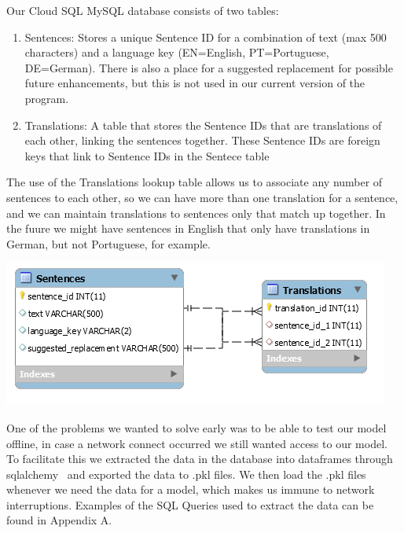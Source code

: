 \documentclass[runningheads]{llncs}
\begin{document}
	Our Cloud SQL MySQL database consists of two tables:
			
		\begin{enumerate}
			\item Sentences: Stores a unique Sentence ID for a combination of text (max 500 characters) and a language key (EN=English, PT=Portuguese, DE=German). There is also a place for a suggested replacement for possible future enhancements, but this is not used in our current version of the program.
			\item Translations: A table that stores the Sentence IDs that are translations of each other, linking the sentences together. These Sentence IDs are foreign keys that link to Sentence IDs in the Sentece table
		\end{enumerate}

	The use of the Translations lookup table allows us to associate any number of sentences to each other, so we can have more than one translation for a sentence, and we can maintain translations to sentences only that match up together. In the fuure we might have sentences in English that only have translations in German, but not Portuguese, for example. 	

	\begin{minipage}{\linewidth}
		\begin{center}
			\includegraphics[width=\linewidth]{Database_Diagram.png}
			\label{fig:Database Diagrams}
			\vspace*{1cm}
		\end{center}
	\end{minipage}
	\afterpage{\clearpage}

	One of the problems we wanted to solve early was to be able to test our model offline, in case a network connect occurred we still wanted access to our model. To facilitate this we extracted the data in the database into dataframes through sqlalchemy~\cite{ref_url15} and exported the data to .pkl files. We then load the .pkl files whenever we need the data for a model, which makes us immune to network interruptions. Examples of the SQL Queries used to extract the data can be found in Appendix A.
\end{document}
